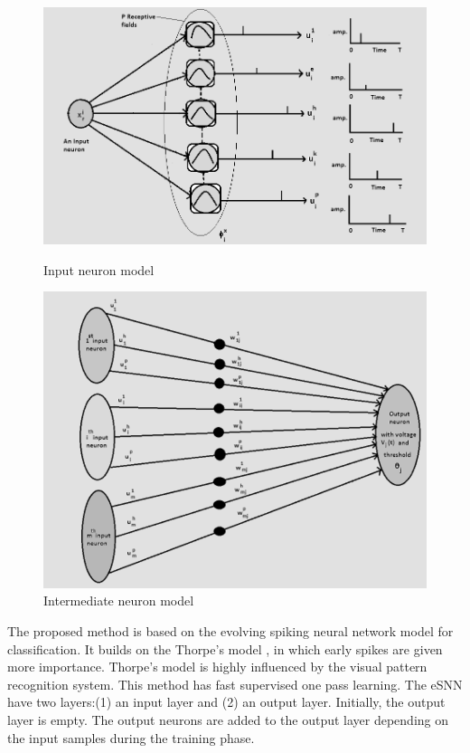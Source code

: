 \begin{figure}[!htb]
	\includegraphics[width=\linewidth]{fig/snn/esnn_input.png}
	\caption{Input neuron model}\label{fig:esnn_input}
	\endminipage\hfill
	\includegraphics[width=\linewidth]{fig/snn/esnn_output.png}
	\caption{Intermediate neuron model}\label{fig:esnn_output}
	\endminipage
\end{figure}

The proposed method is based on the evolving spiking neural network model for classification. It builds on the Thorpe’s model \citep{thorpe2001spike}, in which early spikes are given more importance. Thorpe's model is highly influenced by the visual pattern recognition system. This method has fast supervised one pass learning. The eSNN have two layers:(1) an input layer and (2) an output layer. Initially, the output layer is empty. The output neurons are added to the output layer depending on the input samples during the training phase.

